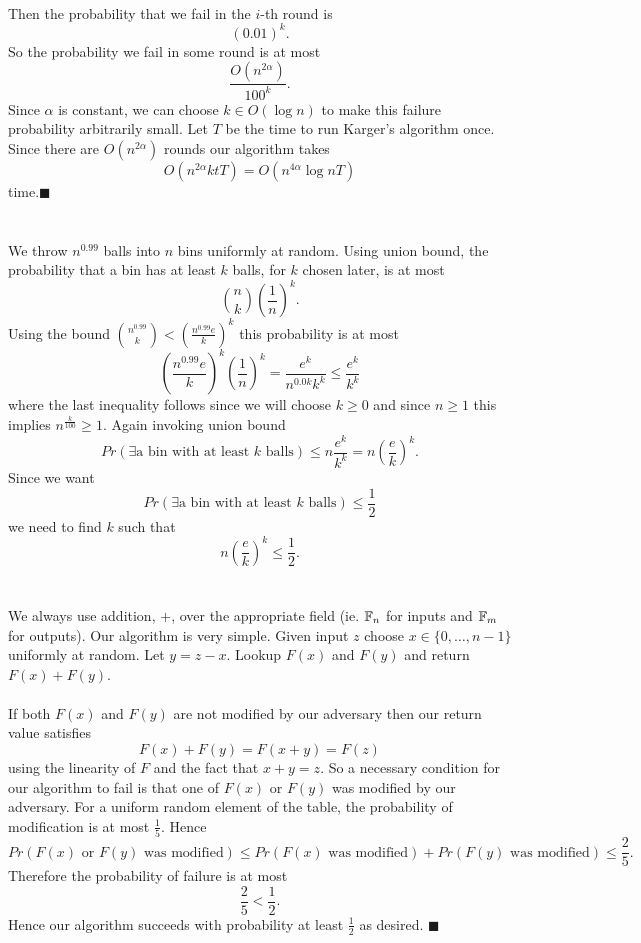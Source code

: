\documentclass[letterpaper,12pt,oneside,onecolumn]{article}
\begin{document}
\paragraph{}
Then the probability that we fail in the $i$-th round is
$$(0.01)^k.$$
So the probability we fail in some round is at most
$$\frac{O(n^{2\alpha})}{100^k}.$$
Since $\alpha$ is constant, we can choose $k \in O(\log n)$ to make this failure probability arbitrarily small. Let $T$ be the time to run Karger's algorithm once.  Since there are $O(n^{2\alpha})$ rounds our algorithm takes
$$O(n^{2\alpha}ktT) = O(n^{4\alpha}\log n T)$$
time.$ \blacksquare$

\newpage
\section{}
\paragraph{}
We throw $n^{0.99}$ balls into $n$ bins uniformly at random. Using union bound, the probability that a bin has at least $k$ balls, for $k$ chosen later, is at most 
$${n \choose k}(\frac{1}{n})^k.$$
Using the bound ${n^{0.99}\choose k} <(\frac{n^{0.99}e}{k})^k$ this probability is at most
$$(\frac{n^{0.99}e}{k})^k(\frac{1}{n})^k= \frac{e^k}{n^{0.0k}k^k}\leq \frac{e^k}{k^k}$$
where the last inequality follows since we will choose $k \geq 0$ and since $n\geq 1$ this implies $n^\frac{k}{100} \geq 1$.
Again invoking union bound
$$Pr(\exists\text{a bin with at least $k$ balls}) \leq n\frac{e^k}{k^k} = n(\frac{e}{k})^k.$$ 
Since we want
$$Pr(\exists\text{a bin with at least $k$ balls}) \leq \frac{1}{2}$$
we need to find $k$ such that
$$n(\frac{e}{k})^k \leq \frac{1}{2}.$$
\newpage
\section{}
\paragraph{}
We always use addition, $+$, over the appropriate field (ie. $\mathbb{F}_n$ for inputs and $\mathbb{F}_m$ for outputs). Our algorithm is very simple. Given input $z$ choose $x \in \{0,\dots, n-1\}$ uniformly at random. Let $y = z-x$. Lookup $F(x)$ and $F(y)$ and return $F(x) + F(y)$.
\paragraph{}
If both $F(x)$ and $F(y)$ are not modified by our adversary then our return value satisfies
$$F(x) + F(y) = F(x+y) = F(z)$$
using the linearity of $F$ and the fact that $x+y = z$. So a necessary condition for our algorithm to fail is that one of $F(x)$ or $F(y)$ was modified by our adversary. For a uniform random element of the table, the probability of modification is at most $\frac{1}{5}$. Hence
$$Pr(F(x)\text{ or } F(y)\text{ was modified}) \leq Pr(F(x) \text{ was modified}) + Pr(F(y)\text{ was modified}) \leq \frac{2}{5}.$$
Therefore the probability of failure is at most
$$\frac{2}{5} < \frac{1}{2}.$$
Hence our algorithm succeeds with probability at least $\frac{1}{2}$ as desired. $\blacksquare$
\newpage
\end{document}
